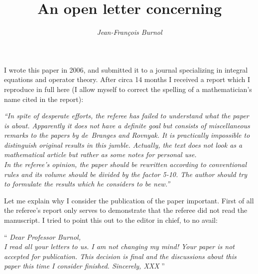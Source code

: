 \documentclass[11pt]{article}
\begin{document}
\title{\bf An open letter concerning \\
}
\author{\large\em Jean-Fran\c{c}ois Burnol}

\date{} %

\maketitle
\thispagestyle{empty}

I wrote this paper in 2006, and
submitted it to a journal specializing in integral equations
and operator theory. After circa 14 months I received a
report which I reproduce in full here (I allow myself to
correct the spelling of a mathematician's name cited in
the report):

\smallskip

\emph{``In spite of desperate efforts, the referee has failed to
  understand what the paper is about. Apparently it does not
  have a definite goal but consists of miscellaneous remarks
  to the papers by de~Branges and Rovnyak. It is practically
  impossible to distinguish original results in this
  jumble. Actually, the text does not look as a mathematical
  article
  but rather as some notes for personal use.\\
  In the referee's opinion, the paper should be rewritten
  according to conventional rules and its volume should be
  divided by the factor 5-10.  The author should try to
  formulate the results which he considers to be new.''
}

\smallskip


Let me explain why I consider  the publication of
the paper important. First of all the referee's report only serves to
demonstrate that the referee did not read the manuscript. I
tried to point this out to the editor in chief, to no avail:

\smallskip
``
\emph{
Dear Professor Burnol,\\
I read all your letters to us. I am not changing my mind!
Your paper is not accepted for publication. This decision is final and the
discussions about this paper this time I consider finished.
Sincerely, XXX
}
''
\smallskip
\end{document}
